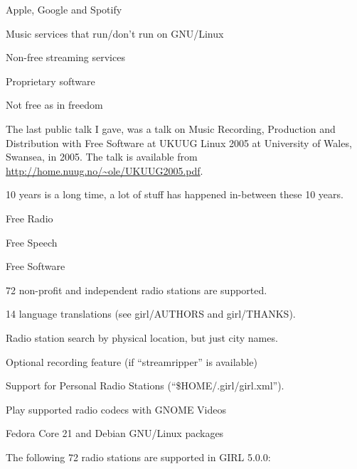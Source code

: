 \documentclass[20pt,landscape]{foils}
\begin{document}

\begin{list1}
\item Apple, Google and Spotify
  \begin{list2}
  \item Music services that run/don't run on GNU/Linux
  \item Non-free streaming services
  \item Proprietary software
  \item Not free as in freedom
  \end{list2}
\end{list1}


The last public talk I gave, was a talk on Music Recording, Production and Distribution with Free Software at UKUUG Linux 2005 at University of Wales, Swansea, in 2005.  The talk is available from \url{http://home.nuug.no/~ole/UKUUG2005.pdf}.

10 years is a long time, a lot of stuff has happened in-between these 10 years.


\begin{list2}
\item Free Radio
\item Free Speech
\item Free Software
\end{list2}


\begin{list1}
\item 72 non-profit and independent radio stations are supported.
\item 14 language translations (see girl/AUTHORS and girl/THANKS).
\item Radio station search by physical location, but just city names.
\item Optional recording feature (if ``streamripper'' is available)
\item Support for Personal Radio Stations (``\$HOME/.girl/girl.xml'').
\item Play supported radio codecs with GNOME Videos
\item Fedora Core 21 and Debian GNU/Linux packages
\end{list1}


The following 72 radio stations are supported in GIRL 5.0.0:
\end{document}
